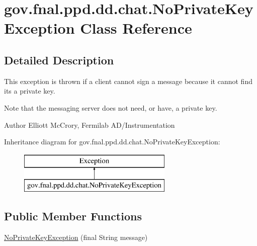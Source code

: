 \hypertarget{classgov_1_1fnal_1_1ppd_1_1dd_1_1chat_1_1NoPrivateKeyException}{\section{gov.\-fnal.\-ppd.\-dd.\-chat.\-No\-Private\-Key\-Exception Class Reference}
\label{classgov_1_1fnal_1_1ppd_1_1dd_1_1chat_1_1NoPrivateKeyException}
}


\subsection{Detailed Description}
This exception is thrown if a client cannot sign a message because it cannot find its a private key. 

Note that the messaging server does not need, or have, a private key. 

\begin{DoxyAuthor}{Author}
Elliott Mc\-Crory, Fermilab A\-D/\-Instrumentation 
\end{DoxyAuthor}
Inheritance diagram for gov.\-fnal.\-ppd.\-dd.\-chat.\-No\-Private\-Key\-Exception\-:\begin{figure}[H]
\begin{center}
\leavevmode
\includegraphics[height=2.000000cm]{classgov_1_1fnal_1_1ppd_1_1dd_1_1chat_1_1NoPrivateKeyException}
\end{center}
\end{figure}
\subsection*{Public Member Functions}
\begin{DoxyCompactItemize}
\item 
\hyperlink{classgov_1_1fnal_1_1ppd_1_1dd_1_1chat_1_1NoPrivateKeyException_a3ffa7c8308049379103676a72dfd6416}{No\-Private\-Key\-Exception} (final String message)
\end{DoxyCompactItemize}


